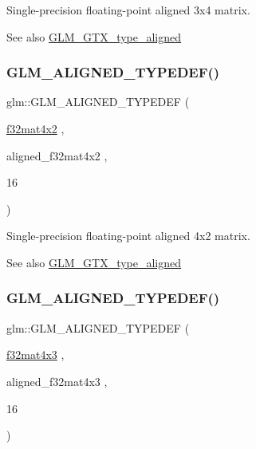 Single-\/precision floating-\/point aligned 3x4 matrix. \begin{DoxySeeAlso}{See also}
\mbox{\hyperlink{group__gtx__type__aligned}{G\+L\+M\+\_\+\+G\+T\+X\+\_\+type\+\_\+aligned}} 
\end{DoxySeeAlso}
\mbox{\label{group__gtx__type__aligned_ga99ce8274c750fbfdf0e70c95946a2875}} 
\subsubsection{\texorpdfstring{GLM\_ALIGNED\_TYPEDEF()}{GLM\_ALIGNED\_TYPEDEF()}\hspace{0.1cm}{\footnotesize\ttfamily [190/209]}}
{\footnotesize\ttfamily glm\+::\+G\+L\+M\+\_\+\+A\+L\+I\+G\+N\+E\+D\+\_\+\+T\+Y\+P\+E\+D\+EF (\begin{DoxyParamCaption}\item[{\mbox{\hyperlink{group__gtc__type__precision_gab531a3d0479121732ae090254e0bd58f}{f32mat4x2}}}]{,  }\item[{aligned\+\_\+f32mat4x2}]{,  }\item[{16}]{ }\end{DoxyParamCaption})}

Single-\/precision floating-\/point aligned 4x2 matrix. \begin{DoxySeeAlso}{See also}
\mbox{\hyperlink{group__gtx__type__aligned}{G\+L\+M\+\_\+\+G\+T\+X\+\_\+type\+\_\+aligned}} 
\end{DoxySeeAlso}
\mbox{\label{group__gtx__type__aligned_ga9476ef66790239df53dbe66f3989c3b5}} 
\subsubsection{\texorpdfstring{GLM\_ALIGNED\_TYPEDEF()}{GLM\_ALIGNED\_TYPEDEF()}\hspace{0.1cm}{\footnotesize\ttfamily [191/209]}}
{\footnotesize\ttfamily glm\+::\+G\+L\+M\+\_\+\+A\+L\+I\+G\+N\+E\+D\+\_\+\+T\+Y\+P\+E\+D\+EF (\begin{DoxyParamCaption}\item[{\mbox{\hyperlink{group__gtc__type__precision_gad68d998fa74028e02bfadd4778bd549a}{f32mat4x3}}}]{,  }\item[{aligned\+\_\+f32mat4x3}]{,  }\item[{16}]{ }\end{DoxyParamCaption})}


